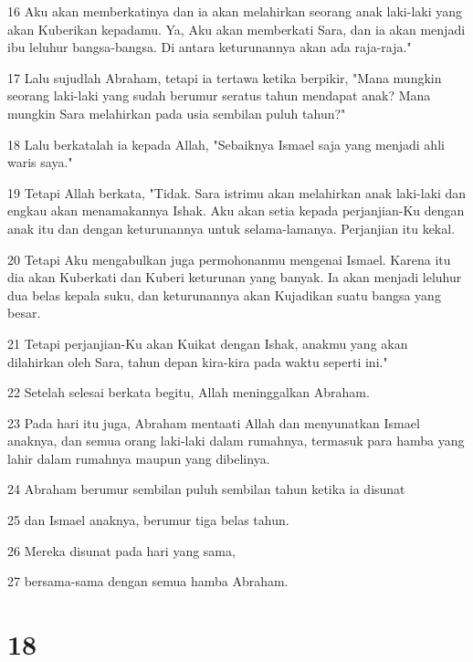 \par 16 Aku akan memberkatinya dan ia akan melahirkan seorang anak laki-laki yang akan Kuberikan kepadamu. Ya, Aku akan memberkati Sara, dan ia akan menjadi ibu leluhur bangsa-bangsa. Di antara keturunannya akan ada raja-raja."
\par 17 Lalu sujudlah Abraham, tetapi ia tertawa ketika berpikir, "Mana mungkin seorang laki-laki yang sudah berumur seratus tahun mendapat anak? Mana mungkin Sara melahirkan pada usia sembilan puluh tahun?"
\par 18 Lalu berkatalah ia kepada Allah, "Sebaiknya Ismael saja yang menjadi ahli waris saya."
\par 19 Tetapi Allah berkata, "Tidak. Sara istrimu akan melahirkan anak laki-laki dan engkau akan menamakannya Ishak. Aku akan setia kepada perjanjian-Ku dengan anak itu dan dengan keturunannya untuk selama-lamanya. Perjanjian itu kekal.
\par 20 Tetapi Aku mengabulkan juga permohonanmu mengenai Ismael. Karena itu dia akan Kuberkati dan Kuberi keturunan yang banyak. Ia akan menjadi leluhur dua belas kepala suku, dan keturunannya akan Kujadikan suatu bangsa yang besar.
\par 21 Tetapi perjanjian-Ku akan Kuikat dengan Ishak, anakmu yang akan dilahirkan oleh Sara, tahun depan kira-kira pada waktu seperti ini."
\par 22 Setelah selesai berkata begitu, Allah meninggalkan Abraham.
\par 23 Pada hari itu juga, Abraham mentaati Allah dan menyunatkan Ismael anaknya, dan semua orang laki-laki dalam rumahnya, termasuk para hamba yang lahir dalam rumahnya maupun yang dibelinya.
\par 24 Abraham berumur sembilan puluh sembilan tahun ketika ia disunat
\par 25 dan Ismael anaknya, berumur tiga belas tahun.
\par 26 Mereka disunat pada hari yang sama,
\par 27 bersama-sama dengan semua hamba Abraham.

\chapter{18}

